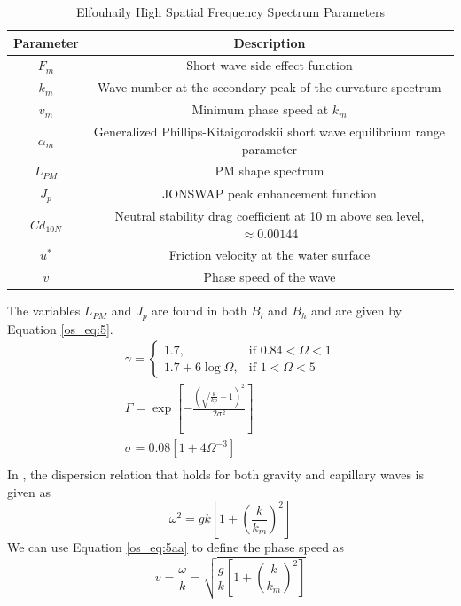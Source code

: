 \begin{table}[H]
  \begin{center}
      \renewcommand{\baselinestretch}{1} \small\normalsize
  \begin{quote}
    \caption[Elfouhaily High Spatial Frequency Spectrum Parameters]{Elfouhaily High Spatial Frequency Spectrum Parameters\label{os_tab:2}}
  \end{quote}
  \begin{tabular} {|c | c |}
    \hline
  \bf{Parameter} & \bf{Description} \\ \hline
  $F_m$ & Short wave side effect function \\ \hline
  $k_m$ &  Wave number at the secondary peak of the curvature spectrum \\ \hline
  $v_m$ &  Minimum phase speed at $k_m$ \\ \hline
  $\alpha_m$ & Generalized Phillips-Kitaigorodskii short wave equilibrium range parameter \\ \hline
  $L_{PM}$ & PM shape spectrum \\ \hline
  $J_p$ & JONSWAP peak enhancement function \\ \hline
  $Cd_{10N}$ & Neutral stability drag coefficient at 10 m above sea level, $\approx 0.00144$ \\ \hline
  $u^*$ & Friction velocity at the water surface \\ \hline
  $v$ & Phase speed of the wave \\ \hline
\end{tabular}
\end{center}
\end{table}
\renewcommand{\baselinestretch}{2} \small\normalsize
The variables $L_{PM}$ and $J_p$ are found in both $B_l$ and $B_h$ and are given by Equation \ref{os_eq:5}.
\begin{equation}
\begin{gathered}
  \label{os_eq:5}
    \gamma = \begin{cases}
    1.7,& \text{if } 0.84 < \Omega < 1\\
    1.7 + 6\log{\Omega}, & \text{if } 1 < \Omega < 5
  \end{cases} \\
  \Gamma = \exp{\left[- \frac{\left(\sqrt{\frac{k}{kp} - 1} \right)^2}{2\sigma^2} \right]} \\
  \sigma = 0.08\left[1 + 4\Omega^{-3} \right] \\
\end{gathered}
\end{equation}
\renewcommand{\baselinestretch}{2} \small\normalsize
In \cite{elfouhaily}, the dispersion relation that holds for both gravity and capillary waves is given as 
\begin{equation}
\label{os_eq:5aa}
\omega^2 = gk\left[1 + \left(\frac{k}{k_m}\right)^2 \right]
\end{equation}
We can use Equation \ref{os_eq:5aa} to define the phase speed as
\begin{equation}
\label{os_eq:5ab}
v = \frac{\omega}{k}= \sqrt{\frac{g}{k}\left[1 + \left(\frac{k}{k_m}\right)^2 \right]}
\end{equation}

